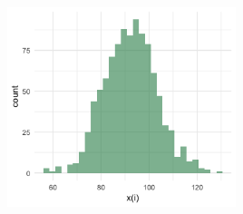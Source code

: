 \begin{question}{}
\begin{enumerate}
\begin{center}
\includegraphics[width=0.5\textwidth]{img/l01-problem5.png}
\end{center}

    \end{enumerate}
\end{question}

